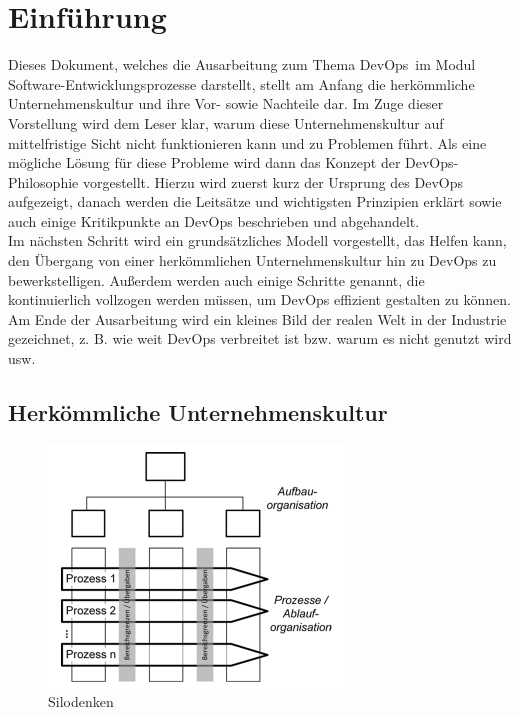 
\chapter{Einführung}

Dieses Dokument, welches die Ausarbeitung zum Thema \glqq DevOps\grqq\ im Modul Software-Entwicklungsprozesse darstellt, stellt am Anfang die herkömmliche Unternehmenskultur und ihre Vor- sowie Nachteile dar. Im Zuge dieser Vorstellung wird dem Leser klar, warum diese Unternehmenskultur auf mittelfristige Sicht nicht funktionieren kann und zu Problemen führt. Als eine mögliche Lösung für diese Probleme wird dann das Konzept der \ac{DevOps}-Philosophie vorgestellt. Hierzu wird zuerst kurz der Ursprung des \ac{DevOps} aufgezeigt, danach werden die Leitsätze und wichtigsten Prinzipien erklärt sowie auch einige Kritikpunkte an \ac{DevOps} beschrieben und abgehandelt.\\
Im nächsten Schritt wird ein grundsätzliches Modell vorgestellt, das Helfen kann, den Übergang von einer herkömmlichen Unternehmenskultur hin zu \ac{DevOps} zu bewerkstelligen. Außerdem werden auch einige Schritte genannt, die kontinuierlich vollzogen werden müssen, um \ac{DevOps} effizient gestalten zu können.\\
Am Ende der Ausarbeitung wird ein kleines Bild der realen Welt in der Industrie gezeichnet, z. B. wie weit \ac{DevOps} verbreitet ist bzw. warum es nicht genutzt wird usw.

\section{Herkömmliche Unternehmenskultur}

\begin{figure}[hb]
\centering
\includegraphics[width=0.7\textwidth]{Graphics/silodenken}
\caption{Silodenken \cite{halstenberg:2020}}
\label{fig:silo}
\end{figure}

